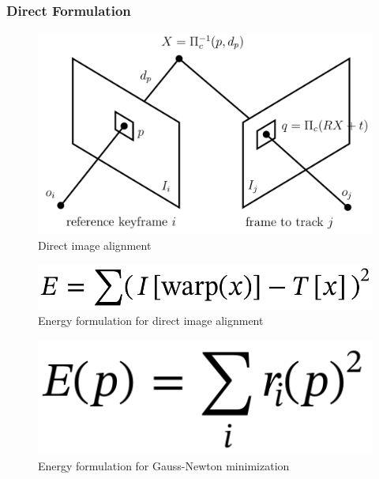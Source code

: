 \subsubsection{Direct Formulation}%
\label{ssub:direct-formulation}

\begin{figure}[ht]
	\centering
	\includegraphics[width=\linewidth]{assets/img/direct-image-alignment.png}
	\caption{Direct image alignment}%
	\label{fig:direct-image-alignment}
\end{figure}

\begin{figure}[ht]
	\centering
	\includegraphics[width=\linewidth]{assets/img/energy-warp.png}
	\caption{Energy formulation for direct image alignment}%
	\label{fig:energy-warp}
\end{figure}

\begin{figure}[ht]
	\centering
	\includegraphics[width=\linewidth]{assets/img/energy-gauss-newton.png}
	\caption{Energy formulation for Gauss-Newton minimization}%
	\label{fig:energy-gauss-newton}
\end{figure}

